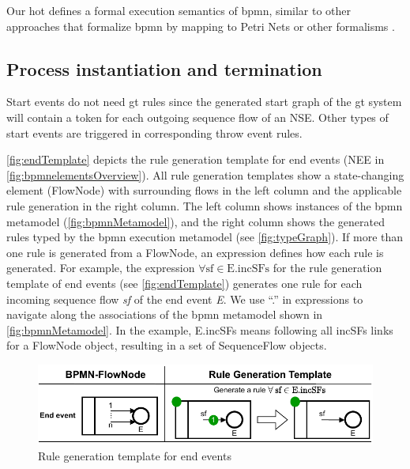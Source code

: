\documentclass{lmcs} %
\theoremstyle{plain}\newtheorem{satz}[thm]{Satz} %
\begin{document}
Our \gls*{hot} defines a formal execution semantics of \gls*{bpmn}, similar to other approaches that formalize \gls*{bpmn} by mapping to Petri Nets or other formalisms \cite{dijkmanSemanticsAnalysisBusiness2008}.

\subsection{Process instantiation and termination} \label{subsec:instAndTermination}

Start events do not need \gls*{gt} rules since the generated start graph of the \gls*{gt} system will contain a token for each outgoing sequence flow of an NSE.
Other types of start events are triggered in corresponding throw event rules.

\autoref{fig:endTemplate} depicts the rule generation template for end events (\textsf{NEE} in \autoref{fig:bpmnelementsOverview}).
All rule generation templates show a state-changing element (\textsf{FlowNode}) with surrounding flows in the left column and the applicable rule generation in the right column.
The left column shows instances of the \gls*{bpmn} metamodel (\autoref{fig:bpmnMetamodel}), and the right column shows the generated rules typed by the \gls*{bpmn} execution metamodel (see \autoref{fig:typeGraph}).
If more than one rule is generated from a \textsf{FlowNode}, an expression defines how each rule is generated.
For example, the expression $\forall \text{sf} \in \text{E.incSFs}$ for the rule generation template of end events (see \autoref{fig:endTemplate}) generates one rule for each incoming sequence flow \textit{sf} of the end event \textit{E}.
We use ``.'' in expressions to navigate along the associations of the \gls*{bpmn} metamodel shown in \autoref{fig:bpmnMetamodel}.
In the example, \textsf{E.incSFs} means following all \textsf{incSFs} links for a \textsf{FlowNode} object, resulting in a set of \textsf{SequenceFlow} objects.

\begin{figure}[ht]
    \centering
    \includegraphics[width=1\textwidth]{images/end_template.pdf}
    \caption{Rule generation template for end events}
    \label{fig:endTemplate}
\end{figure}
    
\end{document}
